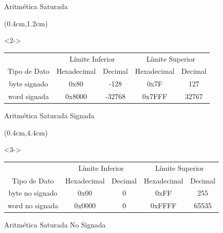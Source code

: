 \begin{frame}{Aritmética Saturada}
 \begin{textblock*}{\textwidth}(0.4cm,1.2cm)
  \begin{onlyenv}<2->
   \begin{table}[h]
    \begin{tabular}{|c|c|c|c|c|} \hline
     \multicolumn{1}{|c|}{} & \multicolumn{2}{|c|}{\color{white} Límite Inferior} & \multicolumn{2}{c|}{\color{white}Límite Superior}\\ \cline{2-5}\cline{2-5}
     \multicolumn{1}{|c|}{\multirow{-2}{*}{\color{white}Tipo de Dato}} & \multicolumn{1}{|c|}{\color{white}Hexadecimal} & \color{white}Decimal & \color{white}Hexadecimal & \color{white}Decimal\\ \hline
     \rowcolor{gray!20} byte signado & 0x80 & -128 & 0x7F & 127 \\ \hline
     \rowcolor{gray!80} word signada & 0x8000 & -32768 & 0x7FFF & 32767 \\ \hline
    \end{tabular}
    \begin{center} Aritmética Saturada Signada \end{center}
   \end{table}
  \end{onlyenv}
 \end{textblock*} 
 \begin{textblock*}{\textwidth}(0.4cm,4.4cm)
  \begin{onlyenv}<3->
   \begin{table}[h]
    \begin{tabular}{|c|c|c|c|c|} \hline
     \multicolumn{1}{|c|}{} & \multicolumn{2}{|c|}{\color{white} Límite Inferior} & \multicolumn{2}{c|}{\color{white}Límite Superior}\\ \cline{2-5}\cline{2-5}
     \multicolumn{1}{|c|}{\multirow{-2}{*}{\color{white}Tipo de Dato}} & \multicolumn{1}{|c|}{\color{white}Hexadecimal} & \color{white}Decimal & \color{white}Hexadecimal & \color{white}Decimal\\ \hline
     \rowcolor{gray!20} byte no signado & 0x00 & 0 & 0xFF & 255 \\ \hline
     \rowcolor{gray!80} word no signada & 0x0000 & 0 & 0xFFFF & 65535 \\ \hline
    \end{tabular}
    \begin{center} Aritmética Saturada No Signada \end{center}
   \end{table}
  \end{onlyenv}
 \end{textblock*} 
\end{frame}

